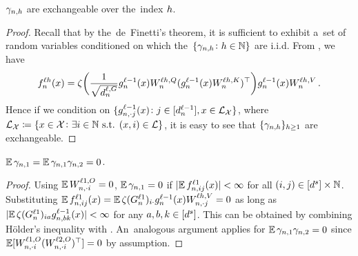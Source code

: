 \vspace{0.5\baselineskip}
\begin{lemma}\label{lem:head_exchangeability}
    $\gamma_{n, h}$ are exchangeable over the~index $h$.
\end{lemma}

\begin{proof}
    Recall that by the~de~Finetti's theorem, it is sufficient to exhibit a~set of random variables conditioned on which the~$\{ \gamma_{n, h} \colon h \in \mathbb{N} \}$ are i.i.d.
    From , we have 
    \begin{equation*}
        {f}^{\ell h}_{n}{(x)}
        =
        \zeta \biggl(
            \frac{1}{\sqrt{d_{n}^{\ell, G}}}
            {g}^{\ell - 1}_{n}{(x)}
            W_{n}^{\ell h, Q}
            ({g}^{\ell - 1}_{n}{(x)} W_{n}^{\ell h, K})^\top
        \biggr)
        {g}^{\ell - 1}_{n}{(x)}
        W_{n}^{\ell h, V}
    \, .
    \end{equation*}
    Hence if we condition on $\{ {g}^{\ell - 1}_{n, \cdot j}{(x)} \colon j \in [d_{n}^{\ell - 1}], x \in \mathcal{L}_{\mathcal{X}} \}$, where $\mathcal{L}_{\mathcal{X}} \coloneqq \{ x \in \mathcal{X} \colon \exists i \in \mathbb{N} \text{ s.t. } (x,  i) \in \mathcal{L} \}$, it is easy to see that $\{ \gamma_{n, h} \}_{h \geq 1}$ are exchangeable.   
\end{proof}


\begin{lemma}\label{lem:head_mean_corr_zero}
    $\operatorname*{\mathbb{E}} \gamma_{n , 1} = \operatorname*{\mathbb{E}} \gamma_{n , 1}  \gamma_{n , 2} = 0$.
\end{lemma}

\begin{proof}
    Using $\operatorname*{\mathbb{E}} W_{n, \cdot i}^{\ell 1, O} = 0$, $\operatorname*{\mathbb{E}} \gamma_{n , 1} = 0$ if $|\! \operatorname*{\mathbb{E}} {f}^{\ell 1}_{n, ij}{(x)} | < \infty$ for all $(i, j) \in [d^s] \times \mathbb{N}$.
    Substituting $\operatorname*{\mathbb{E}} {f}^{\ell 1}_{n, ij}{(x)} = \operatorname*{\mathbb{E}} \zeta(G_{n}^{\ell 1})_{i \cdot} {g}^{\ell - 1}_{n}{(x)} W_{n, \cdot j}^{\ell h, V} = 0$ as long as $|\! \operatorname*{\mathbb{E}} \zeta(G_{n}^{\ell 1})_{i a} {g}^{\ell - 1}_{n, b k}{(x)}| < \infty$ for any $a, b, k \in [d^s]$.
    This can be obtained by combining H{\" o}lder's inequality with .
    An~analogous argument applies for $\operatorname*{\mathbb{E}} \gamma_{n , 1}  \gamma_{n , 2} = 0$ since $\operatorname*{\mathbb{E}} [ W_{n, \cdot i}^{\ell 1, O} (W_{n, \cdot i}^{\ell 2, O})^\top] = 0$ by assumption.
\end{proof}

